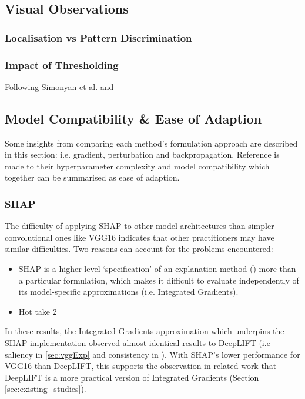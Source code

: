 \documentclass[main]{subfiles}
\begin{document}
\newpage
\subsection{Visual Observations}

\subsubsection{Localisation vs Pattern Discrimination}

\subsubsection{Impact of Thresholding}
Following Simonyan et al. and 

\newpage
\subsection{Model Compatibility \& Ease of Adaption} \label{sec:compatibility}
Some insights from comparing each method's formulation approach are described in this section: i.e. gradient, perturbation and backpropagation. Reference is made to their hyperparameter complexity and model compatibility which together can be summarised as ease of adaption.
\subsubsection{SHAP}
The difficulty of applying SHAP to other model architectures than simpler convolutional ones like VGG16 indicates that other practitioners may have similar difficulties. Two reasons can account for the problems encountered:

\begin{itemize}
\item SHAP is a higher level `specification' of an explanation method (\label{sec:othermodelag}) more than a particular formulation, which makes it difficult to evaluate independently of its model-specific approximations (i.e. Integrated Gradients). 
\item Hot take 2
\end{itemize}

In these results, the Integrated Gradients approximation which underpins the SHAP implementation observed almost identical results to DeepLIFT (i.e saliency in \ref{sec:vggExp} and consistency in ). With SHAP's lower performance for VGG16 than DeepLIFT, this supports the observation in related work that DeepLIFT is a more practical version of Integrated Gradients (Section \ref{sec:existing_studies}).
\end{document}
